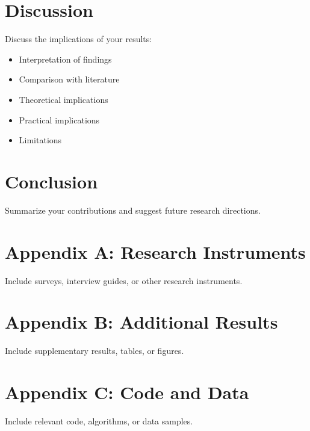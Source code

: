 \documentclass[12pt]{report}
\begin{document}
\chapter{Discussion}
Discuss the implications of your results:
\begin{itemize}
    \item Interpretation of findings
    \item Comparison with literature
    \item Theoretical implications
    \item Practical implications
    \item Limitations
\end{itemize}

\chapter{Conclusion}
Summarize your contributions and suggest future research directions.

\printbibliography

\appendix
\chapter{Appendix A: Research Instruments}
Include surveys, interview guides, or other research instruments.

\chapter{Appendix B: Additional Results}
Include supplementary results, tables, or figures.

\chapter{Appendix C: Code and Data}
Include relevant code, algorithms, or data samples.
\end{document}
